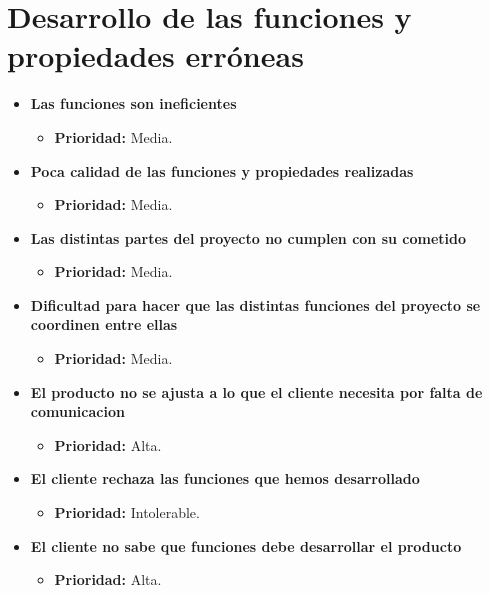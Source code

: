 \documentclass[spanish,a4paper,12pt]{report}	%
\begin{document}
\section{Desarrollo de las funciones y propiedades erróneas}
	\begin{itemize}
		\item \textbf{Las funciones son ineficientes}
			\begin{itemize}
				\item \textbf{Prioridad: }Media.
			\end{itemize}
		
		\item \textbf{Poca calidad de las funciones y propiedades realizadas}
			\begin{itemize}
				\item \textbf{Prioridad: }Media.
			\end{itemize}
		
		\item \textbf{Las distintas partes del proyecto no cumplen con su cometido}
			\begin{itemize}
				\item \textbf{Prioridad: }Media.
			\end{itemize}
		
		\item \textbf{Dificultad para hacer que las distintas funciones del proyecto se coordinen entre ellas}
			\begin{itemize}
				\item \textbf{Prioridad: }Media.
			\end{itemize}
		
		\item \textbf{El producto no se ajusta a lo que el cliente necesita por falta de comunicacion}
			\begin{itemize}
				\item \textbf{Prioridad: }Alta.
			\end{itemize}
		
		\item \textbf{El cliente rechaza las funciones que hemos desarrollado}
			\begin{itemize}
				\item \textbf{Prioridad: }Intolerable.
			\end{itemize}
		
		\item \textbf{El cliente no sabe que funciones debe desarrollar el producto}
			\begin{itemize}
				\item \textbf{Prioridad: }Alta.
			\end{itemize}
		

\end{itemize}
\end{document}
